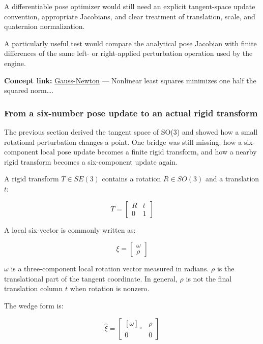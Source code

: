 A differentiable pose optimizer would still need an explicit tangent-space update convention, appropriate Jacobians, and clear treatment of translation, scale, and quaternion normalization.

A particularly useful test would compare the analytical pose Jacobian with finite differences of the same left- or right-applied perturbation operation used by the engine.

\textbf{Concept link:} \hyperref[02-foundations-ii-ch026-optimization-and-inverse-problems]{Gauss-Newton} --- Nonlinear least squares minimizes one half the squared norm\ldots.

\subsubsection{From a six-number pose update to an actual rigid transform}\label{02-foundations-ii-ch027-from-a-six-number-pose-update-to-an-actual-rigid-transform}

\hypertarget{02-foundations-ii-ch027-from-a-six-number-pose-update-to-an-actual-rigid-transform}{}

The previous section derived the tangent space of SO(3) and showed how a small rotational perturbation changes a point. One bridge was still missing: how a six-component local pose update becomes a finite rigid transform, and how a nearby rigid transform becomes a six-component update again.

A rigid transform \(T\in SE(3)\) contains a rotation \(R\in SO(3)\) and a translation \(t\):

\[
T=\begin{bmatrix}R&t\\0&1\end{bmatrix}
\]

A local six-vector is commonly written as:

\[
\xi=\begin{bmatrix}\omega\\\rho\end{bmatrix}
\]

\(\omega\) is a three-component local rotation vector measured in radians. \(\rho\) is the translational part of the tangent coordinate. In general, \(\rho\) is not the final translation column \(t\) when rotation is nonzero.

The wedge form is:

\[
\widehat{\xi}=\begin{bmatrix}[\omega]_\times&\rho\\0&0\end{bmatrix}
\]


